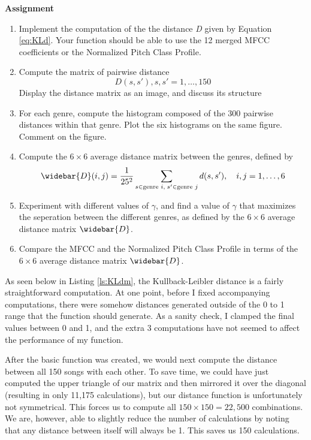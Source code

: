 \documentclass{article} %
\begin{document}
\begin{framed}
\textbf{Assignment}
\begin{enumerate}
\item Implement the computation of the the distance \emph{D} given by Equation \ref{eq:KLd}. Your function should be able to use the 12 merged MFCC coefficients or the Normalized Pitch
Class Profile. 
\item Compute the matrix of pairwise distance
\begin{equation}
D(s,s'),s,s'=1,\dots,150
\end{equation}
Display the distance matrix as an image, and discuss its structure
\item For each genre, compute the histogram composed of the 300 pairwise distances within that genre. Plot the six histograms on the same figure. Comment on the figure. 
\item Compute the $6 \times 6$ average distance matrix between the genres, defined by
\begin{equation}
\widebar{D}(i,j)=\frac{1}{25^2} \sum\limits_{s\in \text{genre } i,\; s' \in \text{genre } j} d(s,s'), \quad i,j=1,\dots,6
\end{equation}
\item Experiment with different values of $\gamma$, and find a value of $\gamma$ that maximizes the seperation between the different genres, as defined by the $6 \times 6$ 
average distance matrix $\widebar{D}$.
\item Compare the MFCC and the Normalized Pitch Class Profile in terms of the $6 \times 6$  average distance matrix $\widebar{D}$.
\end{enumerate}
\end{framed}


As seen below in Listing \ref{ls:KLdm}, the Kullback-Leibler distance is a fairly straightforward computation. At one point, before I fixed accompanying computations, there were somehow
distances generated outside of the 0 to 1 range that the function should generate. As a sanity check, I clamped the final values between 0 and 1, and the extra 3 computations have
not seemed to affect the performance of my function. 

 



After the basic function was created, we would next compute the distance between all 150 songs with each other. To save time, we could have just computed the upper triangle of
our matrix and then mirrored it over the diagonal (resulting in only 11,175 calculations), but our distance function is unfortunately not symmetrical. This forces us to compute all
$150 \times 150 = 22,500$ combinations. We are, however, able to slightly reduce the number of calculations by noting that any distance between itself will always be 1. 
This saves us 150 calculations. 
\end{document}
